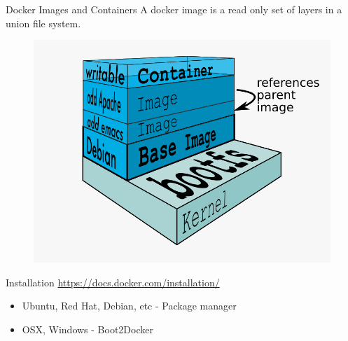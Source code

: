 \documentclass{beamer}
\begin{document}
    \begin{frame}{Docker Images and Containers}
        A docker image is a read only set of layers in a union file system.
        \begin{figure}[htpb]
            \centering
            \includegraphics[width=0.8\linewidth]{docker-image.png}
        \end{figure}
    \end{frame}
    \begin{frame}{Installation}
        \href{https://docs.docker.com/installation/}{https://docs.docker.com/installation/}
        \begin{itemize}
            \item Ubuntu, Red Hat, Debian, etc - Package manager
            \item OSX, Windows - Boot2Docker
        \end{itemize}
    \end{frame}
\end{document}
